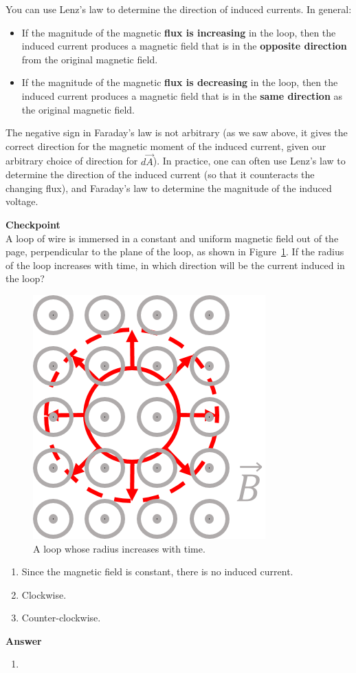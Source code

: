 You can use Lenz's law to determine the direction of induced currents. In general:

\begin{itemize}
\item If the magnitude of the magnetic \textbf{flux is increasing} in the loop, then the induced current produces a magnetic field that is in the \textbf{opposite direction} from the original magnetic field.
\item If the magnitude of the magnetic \textbf{flux is decreasing} in the loop, then the induced current produces a magnetic field that is in the \textbf{same direction} as the original magnetic field.
\end{itemize}

The negative sign in Faraday's law is not arbitrary (as we saw above, it gives the correct direction for the magnetic moment of the induced current, given our arbitrary choice of direction for $d\vec A$). In practice, one can often use Lenz's law to determine the direction of the induced current (so that it counteracts the changing flux), and Faraday's law to determine the magnitude of the induced voltage.

\begin{framed}
\textbf{Checkpoint}\\
A loop of wire is immersed in a constant and uniform magnetic field out of the page, perpendicular to the plane of the loop, as shown in Figure~\ref{fig:induction:areaup}. If the radius of the loop increases with time, in which direction will be the current induced in the loop?

\begin{figure}[!htbp]
\centering
\includegraphics[width=0.2\linewidth]{files/areaup-dd85169b19d9857148685da749c5d617.png}
\caption[]{A loop whose radius increases with time.}
\label{fig:induction:areaup}
\end{figure}

\begin{enumerate}
\item Since the magnetic field is constant, there is no induced current.
\item Clockwise.
\item Counter-clockwise.
\end{enumerate}

\begin{framed}
\textbf{Answer}\\
\begin{enumerate}[resume]
\item
\end{enumerate}
\end{framed}
\end{framed}

